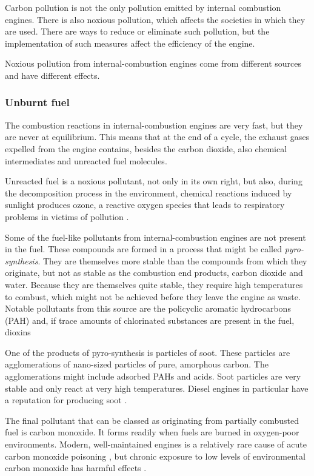 Carbon pollution is not the only pollution emitted by internal combustion
engines. There is also noxious pollution, which affects the societies in which
they are used. There are ways to reduce or eliminate such pollution, but the
implementation of such measures affect the efficiency of the engine. 

Noxious pollution from internal\hyp{}combustion engines come from different sourc\-es
and have different effects.

\subsubsection{Unburnt fuel}

The combustion reactions in internal\hyp{}combustion engines are very fast, but
they are never at equilibrium. This means that at the end of a cycle, the
exhaust gases expelled from the engine contains, besides the carbon dioxide,
also chemical intermediates and unreacted fuel molecules.

Unreacted fuel is a noxious pollutant, not only in its own right, but also,
during the decomposition process in the environment, chemical reactions induced
by sunlight produces ozone, a reactive oxygen species that leads to respiratory
problems in victims of pollution \autocite{Davidson1998}.

Some of the fuel-like pollutants from internal\hyp{}combustion engines are not
present in the fuel. These compounds are formed in a process that might be
called \textit{pyro-synthesis}. They are themselves more stable than the
compounds from which they originate, but not as stable as the combustion end
products, carbon dioxide and water. Because they are themselves quite stable,
they require high temperatures to combust, which might not be achieved before
they leave the engine as waste. Notable pollutants from this source are the
policyclic aromatic hydrocarbons (PAH) and, if trace amounts of chlorinated
substances are present in the fuel, dioxins

One of the products of pyro-synthesis is particles of soot. These particles are
agglomerations of nano-sized particles of pure, amorphous carbon. The
agglomerations might include adsorbed PAHs and acids. Soot particles are very
stable and only react at very high temperatures. Diesel engines in particular
have a reputation for producing soot \autocite{Mohankumar2017}.

The final pollutant that can be classed as originating from partially combusted
fuel is carbon monoxide. It forms readily when fuels are burned in oxygen-poor
environments. Modern, well-maintained engines is a relatively rare cause of
acute carbon monoxide poisoning \autocite{Reumuth2018}, but chronic exposure to
low levels of environmental carbon monoxide has harmful effects
\autocite{Wright2002}.

